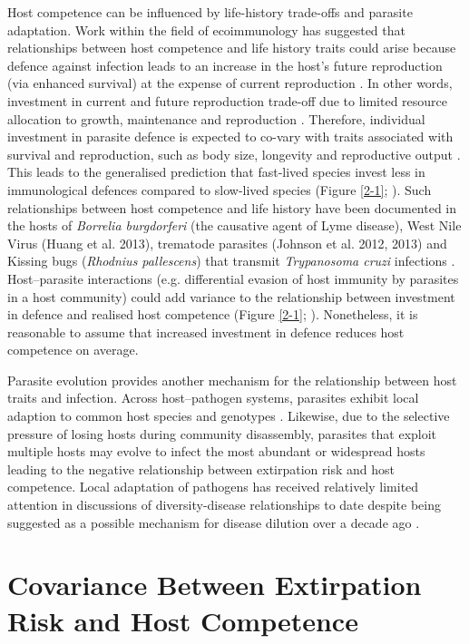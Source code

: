 Host competence can be influenced by life-history trade-offs and parasite adaptation.
Work within the field of ecoimmunology has suggested that relationships between host competence and life history traits could arise because defence against infection leads to an increase in the host's future reproduction (via enhanced survival) at the expense of current reproduction \citep{Hawley2010}.
In other words, investment in current and future reproduction trade-off due to limited resource allocation to growth, maintenance and reproduction \citep{Stearns1992, Roff2001, Ricklefs2002}.
Therefore, individual investment in parasite defence is expected to co-vary with traits associated with survival and reproduction, such as body size, longevity and reproductive output \citep{Lee2006a, Cronin2010}.
This leads to the generalised prediction that fast-lived species invest less in immunological defences compared to slow-lived species (Figure \ref{2-1}; \cite{Cronin2010, Johnson2012}).
Such relationships between host competence and life history have been documented in the hosts of \textit{Borrelia burgdorferi} (the causative agent of Lyme disease), West Nile Virus (Huang et al. 2013), trematode parasites (Johnson et al. 2012, 2013) and Kissing bugs (\textit{Rhodnius pallescens}) that transmit \textit{Trypanosoma cruzi} infections \citep{Gottdenker2012}.
Host–parasite interactions (e.g. differential evasion of host immunity by parasites in a host community) could add variance to the relationship between investment in defence and realised host competence (Figure \ref{2-1}; \cite{Grenfell2004}).
Nonetheless, it is reasonable to assume that increased investment in defence reduces host competence on average.

Parasite evolution provides another mechanism for the relationship between host traits and infection.
Across host–pathogen systems, parasites exhibit local adaption to common host species and genotypes \citep{Kaltz1998, Lively2000, Lajeunesse2002, Montarry2008}.
Likewise, due to the selective pressure of losing hosts during community disassembly, parasites that exploit multiple hosts may evolve to infect the most abundant or widespread hosts leading to the negative relationship between extirpation risk and host competence.
Local adaptation of pathogens has received relatively limited attention in discussions of diversity-disease relationships to date despite being suggested as a possible mechanism for disease dilution over a decade ago \citep{ostfeld2000biodiversity}.

\section{Covariance Between Extirpation Risk and Host Competence}

